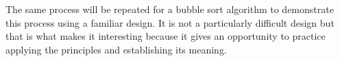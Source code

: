 The same process will be repeated for a bubble sort algorithm to demonstrate this process using a familiar design. It is not a particularly difficult design but that is what makes it interesting because it gives an opportunity to practice applying the principles and establishing its meaning.